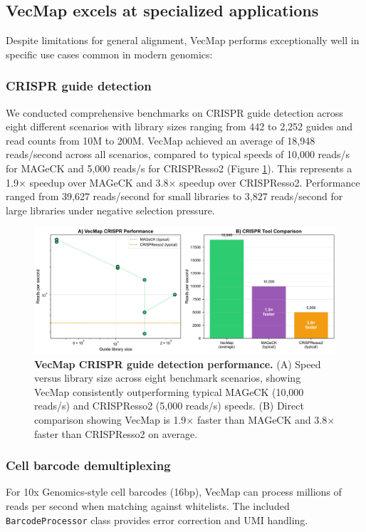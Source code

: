 \documentclass[12pt]{article}
\begin{document}
\subsection{VecMap excels at specialized applications}

Despite limitations for general alignment, VecMap performs exceptionally well in specific use cases common in modern genomics:

\subsubsection{CRISPR guide detection}
We conducted comprehensive benchmarks on CRISPR guide detection across eight different scenarios with library sizes ranging from 442 to 2,252 guides and read counts from 10M to 200M. VecMap achieved an average of 18,948 reads/second across all scenarios, compared to typical speeds of 10,000 reads/s for MAGeCK and 5,000 reads/s for CRISPResso2 (Figure \ref{fig:crispr}). This represents a 1.9× speedup over MAGeCK and 3.8× speedup over CRISPResso2. Performance ranged from 39,627 reads/second for small libraries to 3,827 reads/second for large libraries under negative selection pressure.

\begin{figure}[H]
\centering
\includegraphics[width=\textwidth]{docs/figures/figure2_crispr_performance.pdf}
\caption{\textbf{VecMap CRISPR guide detection performance.} (A) Speed versus library size across eight benchmark scenarios, showing VecMap consistently outperforming typical MAGeCK (10,000 reads/s) and CRISPResso2 (5,000 reads/s) speeds. (B) Direct comparison showing VecMap is 1.9× faster than MAGeCK and 3.8× faster than CRISPResso2 on average.}
\label{fig:crispr}
\end{figure}

\subsubsection{Cell barcode demultiplexing}
For 10x Genomics-style cell barcodes (16bp), VecMap can process millions of reads per second when matching against whitelists. The included \texttt{BarcodeProcessor} class provides error correction and UMI handling.
\end{document}
